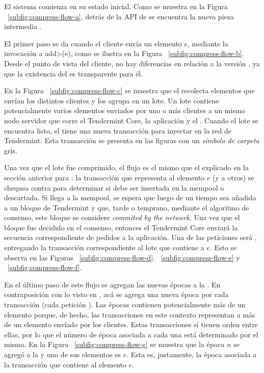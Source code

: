 El sistema comienza en su estado inicial.
Como se muestra en la Figura ~\ref{subfig:compress-flow-a}, detrás de la API de \setchain
se encuentra la nueva pieza intermedia \collector.

%

El primer paso se da cuando el cliente envía un elemento $e$, mediante la invocación a \<add>(e), como se
ilustra en la Figura ~\ref{subfig:compress-flow-b}.
Desde el punto de vista del cliente, no hay diferencias en relación a la versión \vanilla, ya que
la existencia del \collector es transparente para él.

%

En la Figura ~\ref{subfig:compress-flow-c} se muestra que el \collector recolecta elementos que envían los distintos clientes y los agrupa
en un lote.
Un lote contiene potencialmente varios elementos enviados por uno o más clientes a un mismo nodo servidor
que corre el Tendermint Core, la aplicación y el \collector.
Cuando el lote se encuentra listo, el \collector tiene una nueva transacción para inyectar en la red de Tendermint.
Esta transacción se presenta en las figuras con un \textit{símbolo de carpeta} gris.

%

Una vez que el lote fue comprimido, el flujo es el mismo que el explicado en la sección anterior para \vanilla: la transacción
que representa al elemento $e$ (y a otros) se chequea contra \CheckTx para determinar si debe ser insertada
en la mempool o descartada.
%
Si llega a la mempool, se espera que luego de un tiempo sea añadida a un bloque de Tendermint y que,
tarde o temprano, mediante el algoritmo de consenso, este bloque se considere \textit{commited by the network}.
%
Una vez que el bloque fue decidido en el consenso, entonces el Tendermint Core enviará
la secuencia correspondiente de pedidos a la aplicación.
%
Una de las peticiones será \DeliverTx, entregando la transacción correspondiente al lote que contiene a $e$.
%
Esto se observa en las Figuras ~\ref{subfig:compress-flow-d}. ~\ref{subfig:compress-flow-e} y ~\ref{subfig:compress-flow-f}.

%
En el último paso de este flujo se agregan las nuevas épocas a la \setchain.
En contraposición con lo visto en \vanilla, acá se agrega una nueva época por cada transacción (cada petición \DeliverTx).
Las épocas contienen potencialmente más de un elemento porque, de hecho, las transacciones en este contexto representan a más de un elemento
envíado por los clientes.
Estas transacciones sí tienen orden entre ellas, por lo que el número de época asociada a cada una está determinado por el mismo.
En la Figura ~\ref{subfig:compress-flow-g} se muestra que la época $n$ se agregó a la \setchain y uno de sus elementos es $e$. Esta es, justamente, la época asociada
a la transacción que contiene al elemento $e$.


